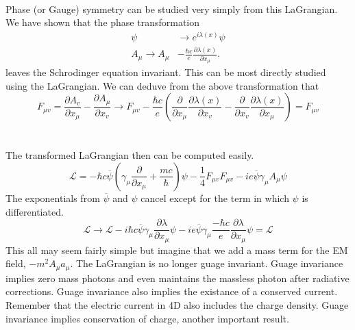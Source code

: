 \documentclass{report}
\begin{document}
\\
Phase (or Gauge) symmetry can be studied very simply from this LaGrangian. We have shown that the phase transformation
\begin{align*}
	\psi                & \to e^{i \lambda \left( x \right)}\psi                                             \\
	A_{\mu} \to A_{\mu} & - \frac{\hbar c}{e}\frac{ \partial \lambda \left( x \right)  }{ \partial x_{\mu} }
	.\end{align*}
leaves the Schrodinger equation invariant. This can be most directly studied using the LaGrangian. We can deduve from the above transformation that
\begin{equation}
	F_{\mu v} = \frac{ \partial A_{v} }{ \partial x_{\mu} } - \frac{ \partial A_{\mu} }{ \partial x_{v} } \to F_{\mu v} - \frac{\hbar c}{e} \left( \frac{ \partial  }{ \partial x_{\mu} } \frac{ \partial \lambda \left( x \right)  }{ \partial x_{v} } - \frac{ \partial  }{ \partial x_{v} } \frac{ \partial \lambda \left( x \right)  }{ \partial x_{\mu} }     \right)  = F_{\mu v}
\end{equation}
\\
\\
The transformed LaGrangian then can be computed easily.
\begin{equation}
	\mathcal{L} = -\hbar c \overline{\psi} \left( \gamma_{\mu} \frac{ \partial  }{ \partial x_{\mu} } + \frac{mc}{\hbar}  \right) \psi  - \frac{1}{4} F_{\mu v} F_{\mu v} - i e \overline{ \psi } \gamma_{\mu } A_{\mu} \psi
\end{equation}
The exponentials from $\displaystyle \overline{\psi}$ and $\displaystyle \psi$ cancel except for the term in which $\displaystyle \psi$ is differentiated.
\begin{equation}
	\mathcal{L} \to \mathcal{L} - i \hbar c \overline{\psi}\gamma_{\mu} \frac{ \partial \lambda }{ \partial x_{\mu} } \psi - i e \overline{\psi} \gamma_{\mu} \frac{-\hbar c}{e} \frac{ \partial \lambda }{ \partial x_{\mu} } \psi = \mathcal{L}
\end{equation}
This all may seem fairly simple but imagine that we add a mass term for the EM field, $\displaystyle -m^2 A_{\mu} a_{\mu}$. The LaGrangian is no longer guage invariant. Guage invariance implies zero mass photons and even maintains the massless photon after radiative corrections. Guage invariance also implies the existance of a conserved current. Remember that the electric current in 4D also includes the charge density. Guage invariance implies conservation of charge, another important result.
\end{document}
